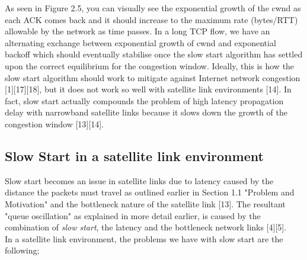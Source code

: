 \documentclass{uathesis}
\begin{document}
As seen in Figure 2.5, you can visually see the exponential growth of the cwnd as each ACK comes back and it should increase to the maximum rate (bytes/RTT) allowable by the network as time passes. In a long TCP flow, we have an alternating exchange between exponential growth of cwnd and exponential backoff which should eventually stabilise once the slow start algorithm has settled upon the correct equilibrium for the congestion window. Ideally, this is how the slow start algorithm should work to mitigate against Internet network congestion [1][17][18], but it does not work so well with satellite link environments [14]. In fact, slow start actually compounds the problem of high latency propagation delay with narrowband satellite links because it slows down the growth of the congestion window [13][14]. \\

\subsection{Slow Start in a satellite link environment}
Slow start becomes an issue in satellite links due to latency caused by the distance the packets must travel as outlined earlier in Section 1.1 "Problem and Motivation" and the bottleneck nature of the satellite link [13]. The resultant "queue oscillation" as explained in more detail earlier, is caused by the combination of \emph{slow start}, the latency and the bottleneck network links [4][5]. \\

In a satellite link environment, the problems we have with slow start are the following; \\
\end{document}
